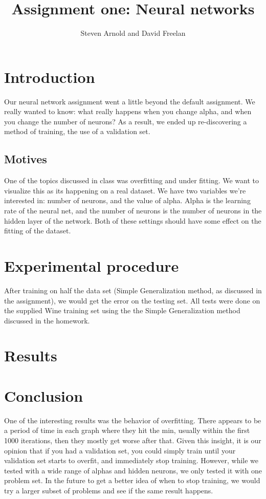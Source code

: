 \documentclass[11pt]{amsart}
\title{Assignment one: Neural networks}
\author{Steven Arnold and David Freelan}
\begin{document}
\maketitle


\section{Introduction}
Our neural network assignment went a little beyond the default assignment. We really wanted to know: what really happens when you change alpha, and when you change the number of neurons? As a result, we ended up re-discovering a method of training, the use of a validation set.
\subsection{Motives} One of the topics discussed in class was overfitting and under fitting. We want to visualize this as its happening on a real dataset. We have two variables we're interested in: number of neurons, and the value of alpha. Alpha is the learning rate of the neural net, and the number of neurons is the number of neurons in the hidden layer of the network.  Both of these settings should have some effect on the fitting of the dataset.
\section{Experimental procedure}
After training on half the data set (Simple Generalization method, as discussed in the assignment), we would get the error on the testing set. 
All tests were done on the supplied Wine training set using the the Simple Generalization method discussed in the homework. 
\section{Results}

\section{Conclusion}
One of the interesting results was the behavior of overfitting. There appears to be a period of time in each graph where they hit the min, usually within the first 1000 iterations, then they mostly get worse after that. Given this insight, it is our opinion that if you had a validation set, you could simply train until your validation set starts to overfit, and immediately stop training. However, while we tested with a wide range of alphas and hidden neurons, we only tested it with one problem set. In the future to get a better idea of when to stop training, we would try a larger subset of problems and see if the same result happens.
\end{document}
